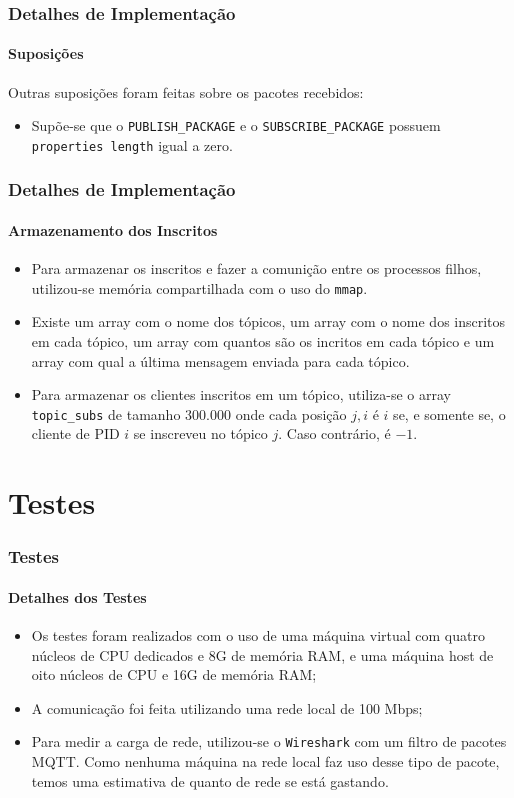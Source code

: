 \documentclass[10pt]{beamer}
\begin{document}
    \begin{frame}[t]
      \frametitle{Detalhes de Implementação}
      \framesubtitle{Suposições}
        Outras suposições foram feitas sobre os pacotes recebidos:
        \begin{itemize}
          \item Supõe-se que o \texttt{PUBLISH\_PACKAGE} e o
            \texttt{SUBSCRIBE\_PACKAGE} possuem \texttt{properties length} igual
            a zero.
        \end{itemize}
    \end{frame}

    \begin{frame}[t]
      \frametitle{Detalhes de Implementação}
      \framesubtitle{Armazenamento dos Inscritos}
      \begin{itemize}
        \item Para armazenar os inscritos e fazer a comunição entre os processos
          filhos, utilizou-se memória compartilhada com o uso do \texttt{mmap}.
        \item Existe um array com o nome dos tópicos, um array com o nome dos
          inscritos em cada tópico, um array com quantos são os incritos em cada
          tópico e um array com qual a última mensagem enviada para cada tópico.
        \item Para armazenar os clientes inscritos em um tópico, utiliza-se o
          array \texttt{topic\_subs} de tamanho $300.000$ onde cada posição
          $j,i$ é $i$ se, e somente se, o cliente de PID $i$ se inscreveu no
          tópico $j$. Caso contrário, é $-1$.
      \end{itemize}
    \end{frame}

    \section{Testes}
    \begin{frame}[t]
      \frametitle{Testes}
      \framesubtitle{Detalhes dos Testes}
      \begin{itemize}
        \item Os testes foram realizados com o uso de uma máquina virtual com
          quatro núcleos de CPU dedicados e 8G de memória RAM, e uma máquina
          host de oito núcleos de CPU e 16G de memória RAM;
        \item A comunicação foi feita utilizando uma rede local de 100 Mbps;
        \item Para medir a carga de rede, utilizou-se o \texttt{Wireshark} com
          um filtro de pacotes MQTT. Como nenhuma máquina na rede local faz uso
          desse tipo de pacote, temos uma estimativa de quanto de rede se está
          gastando.
      \end{itemize}

    \end{frame}
\end{document}

